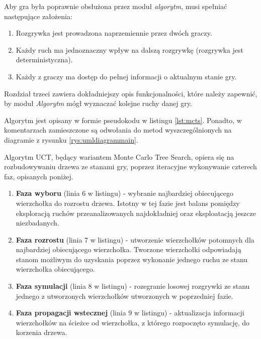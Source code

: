 \documentclass{article}
\newcommand{\modulename}[1]{\textit{#1}}
\begin{document}
	\noindent Aby gra była poprawnie obsłużona przez moduł \modulename{algorytm}, musi spełniać następujące założenia: \\
		
	\begin{enumerate}
		\item Rozgrywka jest prowadzona naprzemiennie przez dwóch graczy.
		\item Każdy ruch ma jednoznaczny wpływ na dalszą rozgrywkę (rozgrywka jest deterministyczna).
		\item Każdy z graczy ma dostęp do pełnej informacji o aktualnym stanie gry. \\
	\end{enumerate} 
	
	\noindent Rozdział trzeci zawiera dokładniejszy opis funkcjonalności, które należy zapewnić, by moduł \modulename{Algorytm} mógł wyznaczać kolejne ruchy danej gry.
	
	\clearpage
	
	\noindent Algorytm jest opisany w formie pseudokodu w listingu \ref{lst:mcts}. Ponadto, w komentarzach zamieszczone są odwołania do metod wyszczególnionych na diagramie z rysunku \ref{rys:umldiagrammain}.
	
	\noindent Algorytm UCT, będący wariantem Monte Carlo Tree Search, opiera się na rozbudowywaniu drzewa ze stanami gry, poprzez iteracyjne wykonywanie czterech faz, opisanych poniżej.\\
	\begin{enumerate}
		\item \textbf{Faza wyboru} (linia 6 w listingu) - wybranie najbardziej obiecującego wierzchołka do rozrostu drzewa. Istotny w tej fazie jest balans pomiędzy eksploracją ruchów przeanalizowanych najdokładniej oraz eksploatacją jeszcze niezbadanych.
		\item \textbf{Faza rozrostu} (linia 7 w listingu) - utworzenie wierzchołków potomnych dla najbardziej obiecującego wierzchołka. Tworzone wierzchołki odpowiadają stanom możliwym do uzyskania poprzez wykonanie jednego ruchu ze stanu wierzchołka obiecującego.
		\item \textbf{Faza symulacji} (linia 8 w listingu) - rozegranie losowej rozgrywki ze stanu jednego z utworzonych wierzchołków utworzonych w poprzedniej fazie.
		\item \textbf{Faza propagacji wstecznej} (linia 9 w listingu) - aktualizacja informacji wierzchołków na ścieżce od wierzchołka, z którego rozpoczęto symulację, do korzenia drzewa.\\
	\end{enumerate}
	
\end{document}
